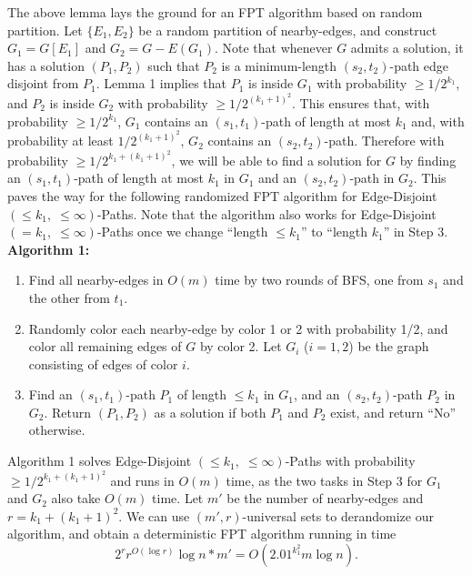 \documentclass{llncs}
\begin{document}
The above lemma lays the ground for an FPT algorithm based on random partition.
Let $\{E_1,E_2\}$ be a random partition of nearby-edges,
and construct $G_1 = G[E_1]$ and $G_2 = G - E(G_1)$.
Note that whenever $G$ admits a solution, it has a solution $(P_1,P_2)$ such
that $P_2$ is a minimum-length $(s_2,t_2)$-path edge disjoint from $P_1$.
Lemma 1 implies that $P_1$ is inside $G_1$ with probability $\ge 1/2^{k_1}$,
and $P_2$ is inside $G_2$ with probability $\ge 1/2^{(k_1 + 1)^2}$.
This ensures that, with probability $\ge 1/2^{k_1}$,
$G_1$ contains an $(s_1,t_1)$-path of length at most $k_1$ and,
with probability at least $1/2^{(k_1 + 1)^2}$,  $G_2$ contains an $(s_2,t_2)$-path.
Therefore with probability $\ge 1/2^{k_1 + (k_1 + 1)^2}$,
we will be able to find a solution for $G$ by finding an $(s_1,t_1)$-path
of length at most $k_1$ in $G_1$ and an $(s_2,t_2)$-path in $G_2$.
This paves the way for the following randomized FPT algorithm for
{\sc Edge-Disjoint $(\le k_1, \; \le \infty)$-Paths}.
Note that the algorithm also works for {\sc Edge-Disjoint $(= k_1, \; \le \infty)$-Paths} once we change ``length $\le k_1$'' to ``length $k_1$'' in Step 3. \\

{\bf Algorithm 1: }

\begin{enumerate}
	\item Find all nearby-edges in $O(m)$ time by two rounds of BFS, one from
	$s_1$ and the other from $t_1$.
	
	\item Randomly color each nearby-edge by color 1 or 2 with probability 1/2,
	and color all remaining edges of $G$ by color 2.
	Let $G_i$ ($i = 1,2$) be the graph consisting of edges of color $i$.
	
	\item Find an $(s_1,t_1)$-path $P_1$ of length $\le k_1$ in $G_1$, and an
	$(s_2,t_2)$-path $P_2$ in $G_2$.
	Return $(P_1,P_2)$ as a solution if both $P_1$ and $P_2$ exist,
	and return ``No'' otherwise.
\end{enumerate}

Algorithm 1 solves {\sc Edge-Disjoint $(\le k_1, \; \le \infty)$-Paths}
with probability $\ge 1/2^{k_1 + (k_1 + 1)^2}$ and runs in $O(m)$ time,
as the two tasks in Step 3 for $G_1$ and $G_2$ also take $O(m)$ time.
Let $m'$ be the number of nearby-edges and $r = k_1 + (k_1 + 1)^2$.
We can use $(m',r)$-universal sets to derandomize our algorithm, and obtain
a deterministic FPT algorithm running in time
\[ 2^{r}r^{O(\log r)} \log n * m' = O(2.01^{k_1^2} m \log n).\]
\end{document}
